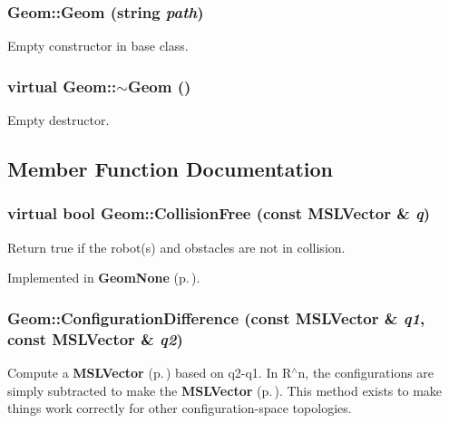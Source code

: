 \subsubsection{\setlength{\rightskip}{0pt plus 5cm}Geom::Geom (string {\em path})}\label{classGeom_a0}


Empty constructor in base class.

\subsubsection{\setlength{\rightskip}{0pt plus 5cm}virtual Geom::$\sim$Geom ()\hspace{0.3cm}{\tt  [inline, virtual]}}\label{classGeom_a1}


Empty destructor.



\subsection{Member Function Documentation}
\subsubsection{\setlength{\rightskip}{0pt plus 5cm}virtual bool Geom::Collision\-Free (const {\bf MSLVector} \& {\em q})\hspace{0.3cm}{\tt  [pure virtual]}}\label{classGeom_a2}


Return true if the robot(s) and obstacles are not in collision.



Implemented in {\bf Geom\-None} {\rm (p.\,\pageref{classGeomNone_a2})}.
\subsubsection{ Geom::Configuration\-Difference (const {\bf MSLVector} \& {\em q1}, const {\bf MSLVector} \& {\em q2})\hspace{0.3cm}{\tt  [virtual]}}\label{classGeom_a4}


Compute a {\bf MSLVector} {\rm (p.\,\pageref{classMSLVector})} based on q2-q1. In R$^\wedge$n, the configurations are simply subtracted to make the {\bf MSLVector} {\rm (p.\,\pageref{classMSLVector})}. This method exists to make things work correctly for other configuration-space topologies.



